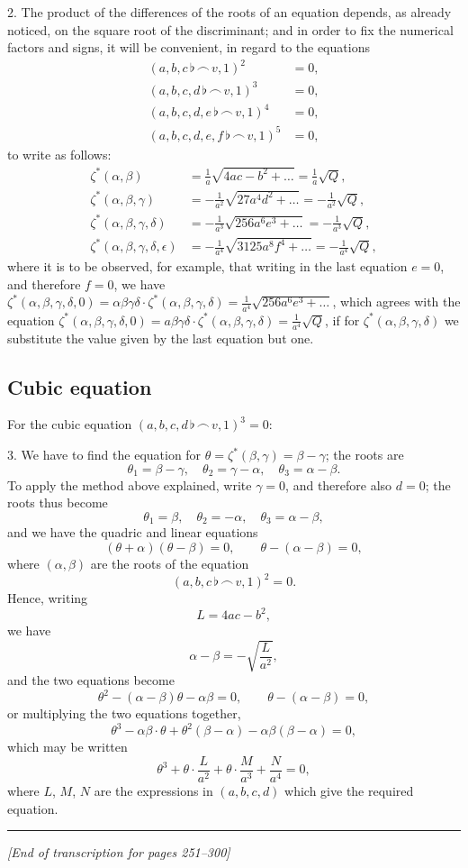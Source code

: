 \documentclass[11pt,a4paper]{article}
\theoremstyle{definition}
\begin{document}
2. The product of the differences of the roots of an equation depends, as already noticed, on the square root of the discriminant; and in order to fix the numerical factors and signs, it will be convenient, in regard to the equations
\begin{align*}
(a,b,c\,\flat\,\frown\, v,1)^2 &= 0,\\
(a,b,c,d\,\flat\,\frown\, v,1)^3 &= 0,\\
(a,b,c,d,e\,\flat\,\frown\, v,1)^4 &= 0,\\
(a,b,c,d,e,f\,\flat\,\frown\, v,1)^5 &= 0,
\end{align*}
to write as follows:
\begin{align*}
\zeta^*(\alpha,\beta) &= \frac{1}{a}\sqrt{4ac-b^2+\ldots}=\frac{1}{a}\sqrt{Q},\\
\zeta^*(\alpha,\beta,\gamma) &= -\frac{1}{a^2}\sqrt{27a^4d^2+\ldots}=-\frac{1}{a^2}\sqrt{Q},\\
\zeta^*(\alpha,\beta,\gamma,\delta) &= -\frac{1}{a^3}\sqrt{256a^6e^3+\ldots}=-\frac{1}{a^3}\sqrt{Q},\\
\zeta^*(\alpha,\beta,\gamma,\delta,\epsilon) &= -\frac{1}{a^4}\sqrt{3125a^8f^4+\ldots}=-\frac{1}{a^4}\sqrt{Q},
\end{align*}
where it is to be observed, for example, that writing in the last equation $e=0$, and therefore $f=0$, we have $\zeta^*(\alpha,\beta,\gamma,\delta,0)=\alpha\beta\gamma\delta\cdot\zeta^*(\alpha,\beta,\gamma,\delta)=\frac{1}{a^4}\sqrt{256a^6e^3+\ldots}$, which agrees with the equation $\zeta^*(\alpha,\beta,\gamma,\delta,0)=a\beta\gamma\delta\cdot\zeta^*(\alpha,\beta,\gamma,\delta)=\frac{1}{a^4}\sqrt{Q}$, if for $\zeta^*(\alpha,\beta,\gamma,\delta)$ we substitute the value given by the last equation but one.

\subsection*{Cubic equation}

For the cubic equation $(a,b,c,d\,\flat\,\frown\, v,1)^3=0$:

3. We have to find the equation for $\theta=\zeta^*(\beta,\gamma)=\beta-\gamma$; the roots are
\[
\theta_1=\beta-\gamma,\quad \theta_2=\gamma-\alpha,\quad \theta_3=\alpha-\beta.
\]
To apply the method above explained, write $\gamma=0$, and therefore also $d=0$; the roots thus become
\[
\theta_1=\beta,\quad \theta_2=-\alpha,\quad \theta_3=\alpha-\beta,
\]
and we have the quadric and linear equations
\[
(\theta+\alpha)(\theta-\beta)=0,\qquad \theta-(\alpha-\beta)=0,
\]
where $(\alpha,\beta)$ are the roots of the equation
\[
(a,b,c\,\flat\,\frown\, v,1)^2=0.
\]
Hence, writing
\[
L=4ac-b^2,
\]
we have
\[
\alpha-\beta=-\sqrt{\frac{L}{a^2}},
\]
and the two equations become
\[
\theta^2-(\alpha-\beta)\theta-\alpha\beta=0,\qquad \theta-(\alpha-\beta)=0,
\]
or multiplying the two equations together,
\[
\theta^3-\alpha\beta\cdot\theta+\theta^2(\beta-\alpha)-\alpha\beta(\beta-\alpha)=0,
\]
which may be written
\[
\theta^3+\theta\cdot\frac{L}{a^2}+\theta\cdot\frac{M}{a^3}+\frac{N}{a^4}=0,
\]
where $L$, $M$, $N$ are the expressions in $(a,b,c,d)$ which give the required equation.

\vspace{12pt}
\noindent\rule{\textwidth}{0.4pt}
\begin{center}
\textit{[End of transcription for pages 251--300]}
\end{center}
\end{document}
